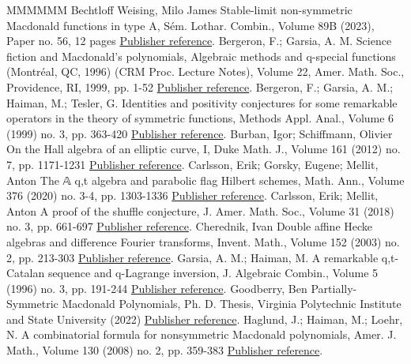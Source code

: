 \begin{thebibliography}{MMMMMM}
 Bechtloff Weising, Milo James Stable-limit non-symmetric Macdonald functions in type A, Sém. Lothar. Combin., Volume 89B (2023), Paper no. 56, 12 pages \href{https://alco.centre-mersenne.org/articles/10.5802/alco.395/#MBW}{Publisher reference}.
 Bergeron, F.; Garsia, A. M. Science fiction and Macdonald’s polynomials, Algebraic methods and q-special functions (Montréal, QC, 1996) (CRM Proc. Lecture Notes), Volume 22, Amer. Math. Soc., Providence, RI, 1999, pp. 1-52 \href{https://alco.centre-mersenne.org/articles/10.5802/alco.395/#BGSciFi}{Publisher reference}.
 Bergeron, F.; Garsia, A. M.; Haiman, M.; Tesler, G. Identities and positivity conjectures for some remarkable operators in the theory of symmetric functions, Methods Appl. Anal., Volume 6 (1999) no. 3, pp. 363-420 \href{https://alco.centre-mersenne.org/articles/10.5802/alco.395/#BGHT}{Publisher reference}.
 Burban, Igor; Schiffmann, Olivier On the Hall algebra of an elliptic curve, I, Duke Math. J., Volume 161 (2012) no. 7, pp. 1171-1231 \href{https://alco.centre-mersenne.org/articles/10.5802/alco.395/#BS}{Publisher reference}.
 Carlsson, Erik; Gorsky, Eugene; Mellit, Anton The 𝔸 q,t  algebra and parabolic flag Hilbert schemes, Math. Ann., Volume 376 (2020) no. 3-4, pp. 1303-1336 \href{https://alco.centre-mersenne.org/articles/10.5802/alco.395/#GCM_2017}{Publisher reference}.
 Carlsson, Erik; Mellit, Anton A proof of the shuffle conjecture, J. Amer. Math. Soc., Volume 31 (2018) no. 3, pp. 661-697 \href{https://alco.centre-mersenne.org/articles/10.5802/alco.395/#CM_2015}{Publisher reference}.
 Cherednik, Ivan Double affine Hecke algebras and difference Fourier transforms, Invent. Math., Volume 152 (2003) no. 2, pp. 213-303 \href{https://alco.centre-mersenne.org/articles/10.5802/alco.395/#C_2003}{Publisher reference}.
 Garsia, A. M.; Haiman, M. A remarkable q,t-Catalan sequence and q-Lagrange inversion, J. Algebraic Combin., Volume 5 (1996) no. 3, pp. 191-244 \href{https://alco.centre-mersenne.org/articles/10.5802/alco.395/#GHCat}{Publisher reference}.
 Goodberry, Ben Partially-Symmetric Macdonald Polynomials, Ph. D. Thesis, Virginia Polytechnic Institute and State University (2022) \href{https://alco.centre-mersenne.org/articles/10.5802/alco.395/#Goodberry}{Publisher reference}.
 Haglund, J.; Haiman, M.; Loehr, N. A combinatorial formula for nonsymmetric Macdonald polynomials, Amer. J. Math., Volume 130 (2008) no. 2, pp. 359-383 \href{https://alco.centre-mersenne.org/articles/10.5802/alco.395/#haglund2007combinatorial}{Publisher reference}.

\end{thebibliography}
